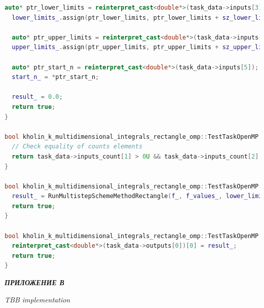 \documentclass[14pt,a4paper]{article}
\begin{document}
\begin{framed}
\begin{lstlisting}[language=C++]
  auto* ptr_lower_limits = reinterpret_cast<double*>(task_data->inputs[3]);
  lower_limits_.assign(ptr_lower_limits, ptr_lower_limits + sz_lower_limits_);

  auto* ptr_upper_limits = reinterpret_cast<double*>(task_data->inputs[4]);
  upper_limits_.assign(ptr_upper_limits, ptr_upper_limits + sz_upper_limits_);

  auto* ptr_start_n = reinterpret_cast<double*>(task_data->inputs[5]);
  start_n_ = *ptr_start_n;

  result_ = 0.0;
  return true;
}

bool kholin_k_multidimensional_integrals_rectangle_omp::TestTaskOpenMP::ValidationImpl() {
  // Check equality of counts elements
  return task_data->inputs_count[1] > 0U && task_data->inputs_count[2] > 0U;
}

bool kholin_k_multidimensional_integrals_rectangle_omp::TestTaskOpenMP::RunImpl() {
  result_ = RunMultistepSchemeMethodRectangle(f_, f_values_, lower_limits_, upper_limits_, dim_, start_n_);
  return true;
}

bool kholin_k_multidimensional_integrals_rectangle_omp::TestTaskOpenMP::PostProcessingImpl() {
  reinterpret_cast<double*>(task_data->outputs[0])[0] = result_;
  return true;
}

\end{lstlisting}
\end{framed}

\newpage

{\raggedright\textit{\large\bfseries ПРИЛОЖЕНИЕ В}\par}

\textit{TBB implementation}
\end{document}
